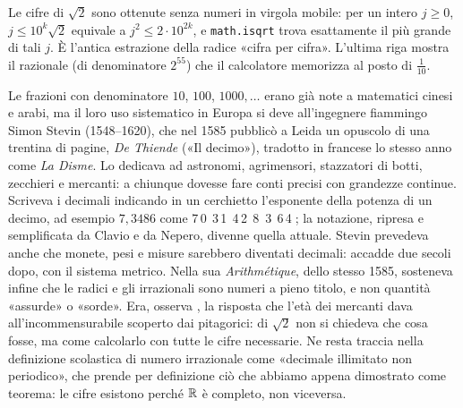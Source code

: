 Le cifre di $\sqrt2$ sono ottenute senza numeri in virgola mobile: per un intero
$j\ge0$, $j\le10^{k}\sqrt2$ equivale a $j^{2}\le2\cdot10^{2k}$, e \texttt{math.isqrt}
trova esattamente il più grande di tali $j$. È l'antica estrazione della radice «cifra
per cifra». L'ultima riga mostra il razionale (di denominatore $2^{55}$) che il
calcolatore memorizza al posto di $\frac1{10}$.

\begin{notastorica}
Le frazioni con denominatore $10$, $100$, $1000,\dots$ erano già note a matematici
cinesi e arabi, ma il loro uso sistematico in Europa si deve all'ingegnere fiammingo Simon
Stevin (1548--1620), che nel 1585 pubblicò a Leida un opuscolo di una trentina di pagine,
\emph{De Thiende} («Il decimo»), tradotto in francese lo stesso anno come \emph{La Disme}.
Lo dedicava ad astronomi, agrimensori, stazzatori di botti, zecchieri e mercanti: a
chiunque dovesse fare conti precisi con grandezze continue. Scriveva i decimali indicando
in un cerchietto l'esponente della potenza di un decimo, ad esempio $7{,}3486$ come
7\,\textcircled{\tiny 0}\,3\,\textcircled{\tiny 1}\,4\,\textcircled{\tiny 2}\,8\,%
\textcircled{\tiny 3}\,6\,\textcircled{\tiny 4}; la notazione, ripresa e semplificata da
Clavio e da Nepero, divenne quella attuale. Stevin prevedeva anche che monete, pesi e
misure sarebbero diventati decimali: accadde due secoli dopo, con il sistema metrico. Nella
sua \emph{Arithmétique}, dello stesso 1585, sosteneva infine che le radici e gli
irrazionali sono numeri a pieno titolo, e non quantità «assurde» o «sorde». Era, osserva
\cite{giusti}, la risposta che l'età dei mercanti dava all'incommensurabile scoperto dai
pitagorici: di $\sqrt2$ non si chiedeva che cosa fosse, ma come calcolarlo con tutte le
cifre necessarie. Ne resta traccia nella definizione scolastica di numero irrazionale come
«decimale illimitato non periodico», che prende per definizione ciò che abbiamo appena
dimostrato come teorema: le cifre esistono perché $\mathbb{R}$ è completo, non viceversa.
\end{notastorica}

